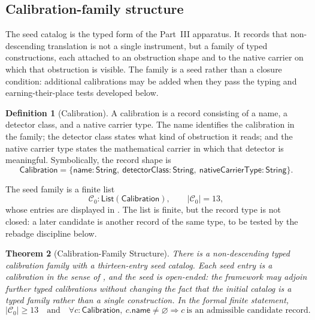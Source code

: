 \documentclass[11pt]{article}
\newtheorem{theorem}{Theorem}[section]
\theoremstyle{definition}
\newtheorem{definition}[theorem]{Definition}
\begin{document}
\subsection{Calibration-family structure}\label{sec:calibration:structure}

The seed catalog is the typed form of the Part~III apparatus.  It records
that non-descending translation is not a single instrument, but a family
of typed constructions, each attached to an obstruction shape and to the
native carrier on which that obstruction is visible.  The family is a
seed rather than a closure condition: additional calibrations may be
added when they pass the typing and earning-their-place tests developed
below.

\begin{definition}[Calibration]\label{def:calibration}
A calibration is a record consisting of a name, a detector class, and a
native carrier type.  The name identifies the calibration in the family;
the detector class states what kind of obstruction it reads; and the
native carrier type states the mathematical carrier in which that
detector is meaningful.
Symbolically, the record shape is
\[
  \mathsf{Calibration}
  =
  \{\mathsf{name}:\mathsf{String},\
    \mathsf{detectorClass}:\mathsf{String},\
    \mathsf{nativeCarrierType}:\mathsf{String}\}.
\]
\end{definition}

The seed family is a finite list
\[
  \mathcal C_0:\mathsf{List}(\mathsf{Calibration}),
  \qquad |\mathcal C_0|=13,
\]
whose entries are displayed in .  The list is
finite, but the record type is not closed: a later candidate is another
record of the same type, to be tested by the rebadge discipline below.

\begin{theorem}[Calibration-Family Structure]\label{thm:calibration-family-structure}
There is a non-descending typed calibration family with a thirteen-entry
seed catalog.  Each seed entry is a calibration in the sense of
\Cref{def:calibration}, and the seed is open-ended: the framework may
adjoin further typed calibrations without changing the fact that the
initial catalog is a typed family rather than a single construction.
In the formal finite statement,
\[
  |\mathcal C_0|\ge 13
  \quad\text{and}\quad
  \forall c:\mathsf{Calibration},\ c.\mathsf{name}\ne\varnothing
  \Rightarrow c\ \text{is an admissible candidate record}.
\]
\end{theorem}
\end{document}
